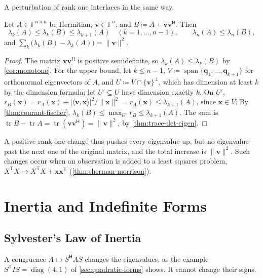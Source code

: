 A perturbation of rank one interlaces in the same way.

\begin{proposition}
\label{prop:rank-one-interlacing}
Let $A\in\mathbb F^{n\times n}$ be Hermitian, $\mathbf v\in\mathbb F^n$, and $B\coloneqq A+\mathbf v\mathbf v^{\mathsf H}$. Then
\[
\lambda_k(A)\le\lambda_k(B)\le\lambda_{k+1}(A)\quad(k=1,\ldots,n-1),\qquad\lambda_n(A)\le\lambda_n(B),
\]
and $\sum_k\bigl(\lambda_k(B)-\lambda_k(A)\bigr)=\|\mathbf v\|^2$.
\end{proposition}

\begin{proof}
The matrix $\mathbf v\mathbf v^{\mathsf H}$ is positive semidefinite, so $\lambda_k(A)\le\lambda_k(B)$ by \cref{cor:monotone}. For the upper bound, let $k\le n-1$, $V\coloneqq\operatorname{span}\{\mathbf q_1,\ldots,\mathbf q_{k+1}\}$ for orthonormal eigenvectors of $A$, and $U\coloneqq V\cap\{\mathbf v\}^\perp$, which has dimension at least $k$ by the dimension formula; let $U'\subseteq U$ have dimension exactly $k$. On $U'$, $r_B(\mathbf x)=r_A(\mathbf x)+|\langle\mathbf v,\mathbf x\rangle|^2/\|\mathbf x\|^2=r_A(\mathbf x)\le\lambda_{k+1}(A)$, since $\mathbf x\in V$. By \cref{thm:courant-fischer}, $\lambda_k(B)\le\max_{U'}r_B\le\lambda_{k+1}(A)$. The sum is $\operatorname{tr}B-\operatorname{tr}A=\operatorname{tr}(\mathbf v\mathbf v^{\mathsf H})=\|\mathbf v\|^2$, by \cref{thm:trace-det-eigen}.
\end{proof}

A positive rank-one change thus pushes every eigenvalue up, but no eigenvalue past the next one of the original matrix, and the total increase is $\|\mathbf v\|^2$. Such changes occur when an observation is added to a least squares problem, $X^{\mathsf T}X\mapsto X^{\mathsf T}X+\mathbf x\mathbf x^{\mathsf T}$ (\cref{thm:sherman-morrison}).

\section{Inertia and Indefinite Forms}
\label{sec:inertia}

\subsection{Sylvester's Law of Inertia}

A congruence $A\mapsto S^{\mathsf H}AS$ changes the eigenvalues, as the example $S^{\mathsf T}IS=\operatorname{diag}(4,1)$ of \cref{sec:quadratic-forms} shows. It cannot change their signs.

